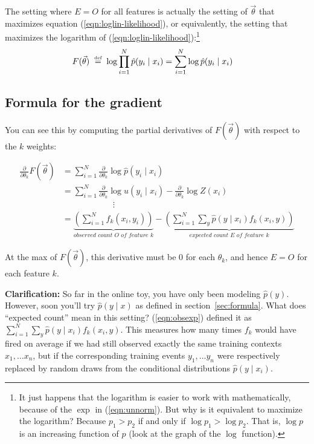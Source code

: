 \documentclass[11pt]{article}
\newcommand{\defeq}{\;\stackrel{\mbox{\tiny def}}{=}\;}
\newcommand{\vtheta}{\vec{\theta}}
\newcommand{\ph}{\hat{p}}
\newcommand{\diffk}{\frac{\partial}{\partial \theta_k}}
\begin{document}
The setting where $E=O$ for all features is actually the
setting of $\vtheta$ that maximizes equation
(\ref{eqn:loglin-likelihood}), or equivalently, the setting that
maximizes the logarithm of (\ref{eqn:loglin-likelihood}):\footnote{It
  just happens that the logarithm is easier to work with
  mathematically, because of the $\exp$ in (\ref{eqn:unnorm}).  But
  why is it equivalent to maximize the logarithm?  Because $p_1 > p_2$
  if and only if $\log p_1 > \log p_2$.  That is, $\log p$ is
  an increasing function of $p$ (look at the graph of the $\log$ function).%
}
\begin{align}
  F(\vtheta) & \defeq \log \prod_{i=1}^N \ph(y_i \mid x_i) = \sum_{i=1}^N \log \ph(y_i \mid x_i) 
\label{eqn:loglin-log-likelihood}
\end{align}

\subsection{Formula for the gradient}

You can see this by computing the partial derivatives of $F(\vtheta)$ 
with respect to the $k$ weights:

\begin{align}
  \diffk F(\vtheta) 
  &= \sum_{i=1}^N \diffk \log \ph(y_i \mid x_i)  \\ %
  &= \sum_{i=1}^N \diffk \log u(y_i \mid x_i) - \diffk \log Z(x_i) \\
  & \hspace{1in}\vdots \nonumber \\ 
  &= \underbrace{\left( \sum_{i=1}^N f_k(x_i,y_i) \right)}_{\textit{observed count $O$ of feature $k$}}
  - \underbrace{\left( \sum_{i=1}^N \sum_y \ph(y\mid x_i) f_k(x_i,y) \right)}_{\textit{expected count $E$ of feature $k$}} \label{eqn:obsexp}
\end{align}

At the max of $F(\vtheta)$, this derivative must be 0 for each
$\theta_k$, and hence $E=O$ for each feature $k$.  

{\bf Clarification:} So far in the online toy, you have only been
modeling $\ph(y)$.  However, soon you'll try $\ph(y\mid x)$ as
defined in section~\ref{sec:formula}.  What does ``expected count'' mean in this
setting?  (\ref{eqn:obsexp}) defined it as $\sum_{i=1}^N \sum_y
\ph(y\mid x_i) f_k(x_i,y)$.  This measures how many times $f_k$ would
have fired on average if we had still observed exactly the same
training contexts $x_1,\ldots x_n$, but if the corresponding training events
$y_1,\ldots y_n$ were respectively replaced by random draws from the
conditional distributions $\ph(y \mid x_i)$.
\end{document}
